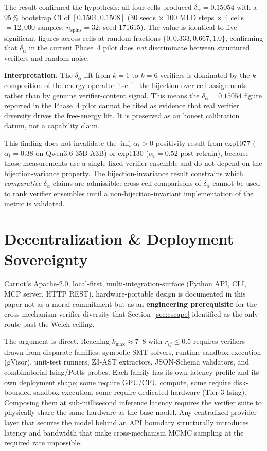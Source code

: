 \documentclass[10pt]{article}
\begin{document}
The result confirmed the hypothesis: all four cells produced $\delta_\alpha = 0.15054$ with
a 95\,\% bootstrap CI of $[0.1504, 0.1508]$ (30 seeds $\times$ 100 MLD steps $\times$ 4 cells
$= 12{,}000$ samples; $n_{\mathrm{spins}} = 32$; seed 171615).
The value is identical to five significant figures across cells at random fractions $\{0, 0.333, 0.667, 1.0\}$,
confirming that $\delta_\alpha$ in the current Phase~4 pilot does \emph{not} discriminate
between structured verifiers and random noise.

\textbf{Interpretation.}
The $\delta_\alpha$ lift from $k=1$ to $k=6$ verifiers is dominated by the $k$-composition
of the energy operator itself---the bijection over cell assignments---rather than by
genuine verifier-content signal. This means the $\delta_\alpha = 0.15054$ figure reported
in the Phase~4 pilot cannot be cited as evidence that real verifier diversity drives the
free-energy lift.  It is preserved as an honest calibration datum, not a capability claim.

This finding does not invalidate the $\inf_t \alpha_t > 0$ positivity result from
exp1077 ($\alpha_t = 0.38$ on Qwen3.6-35B-A3B) or exp1130 ($\alpha_t = 0.52$ post-retrain),
because those measurements use a single fixed verifier ensemble and do not depend on
the bijection-variance property. The bijection-invariance result constrains
which \emph{comparative} $\delta_\alpha$ claims are admissible: cross-cell comparisons
of $\delta_\alpha$ cannot be used to rank verifier ensembles until a non-bijection-invariant
implementation of the metric is validated.

\section{Decentralization \& Deployment Sovereignty}
\label{sec:sovereignty}

Carnot's Apache-2.0, local-first, multi-integration-surface (Python
API, CLI, MCP server, HTTP REST), hardware-portable design is
documented in this paper not as a moral commitment but as an
\textbf{engineering prerequisite} for the cross-mechanism verifier
diversity that Section~\ref{sec:escape} identified as the only
route past the Welch ceiling.

The argument is direct. Reaching $k_{\max} \approx 7\text{--}8$
with $r_{ij} \leq 0.5$ requires verifiers drawn from disparate
families: symbolic SMT solvers, runtime sandbox execution
(gVisor), unit-test runners, Z3-AST extractors, JSON-Schema
validators, and combinatorial Ising/Potts probes. Each family has
its own latency profile and its own deployment shape; some require
GPU/CPU compute, some require disk-bounded sandbox execution, some
require dedicated hardware (Tier 3 Ising). Composing them at
sub-millisecond inference latency requires the verifier suite to
physically share the same hardware as the base model. Any
centralized provider layer that secures the model behind an API
boundary structurally introduces latency and bandwidth that make
cross-mechanism MCMC sampling at the required rate impossible.
\end{document}
